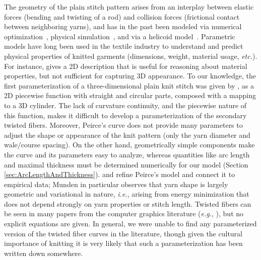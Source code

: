 \documentclass{article}
\newcommand{\ie}{\emph{i.e.}}
\newcommand{\eg}{\emph{e.g.}}
\newcommand{\etc}{\emph{etc.}}
\begin{document}
The geometry of the plain stitch pattern arises from an interplay between elastic forces (bending and twisting of a rod) and collision forces (frictional contact between neighboring yarns), and has in the past been modeled via numerical optimization~\citep{yuksel2012stitch}, physical simulation~\citep{kaldor2010efficient}, and via a helicoid model~\citep{wadekar2020geometric}.  Parametric models have long been used in the textile industry to understand and predict physical properties of knitted garments (dimensions, weight, material usage, \etc{}).  For instance, \citet{Chamberlain:1926:HYF} gives a 2D description that is useful for reasoning about material properties, but not sufficient for capturing 3D appearance.  To our knowledge, the first parameterization of a three-dimensional plain knit stitch was given by \citet[Part IV]{Peirce:1947:GPA}, as a 2D piecewise function with straight and circular parts, composed with a mapping to a 3D cylinder.  The lack of curvature continuity, and the piecewise nature of this function, makes it difficult to develop a parameterization of the secondary twisted fibers.  Moreover, Peirce's curve does not provide many parameters to adjust the shape or appearance of the knit pattern (only the yarn diameter and wale/course spacing).  On the other hand, geometrically simple components make the curve and its parameters easy to analyze, whereas quantities like arc length and maximal thickness must be determined numerically for our model (Section \ref{sec:ArcLengthAndThickness}).  \citet{Leaf:1955:GPK} and \citet{Munden:1959:GDP} refine Peirce's model and connect it to empirical data; Munden in particular observes that yarn shape is largely geometric and variational in nature, \ie, arising from energy minimization that does not depend strongly on yarn properties or stitch length.  Twisted fibers can be seen in many papers from the computer graphics literature (\eg{}, \citet{kaldor2010efficient}), but no explicit equations are given.  In general, we were unable to find any parameterized version of the twisted fiber curves in the literature, though given the cultural importance of knitting it is very likely that such a parameterization has been written down somewhere. 
\end{document}
